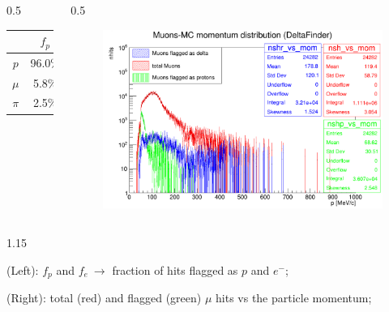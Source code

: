 \documentclass{beamer}
\begin{document}
\begin{frame}
\begin{columns}
\begin{column}{0.5\framewidth}
    \begin{table}[h!]
        \centering
        \renewcommand{\arraystretch}{1.}
        \begin{tabular}{| c | c | c | c | c|} 
        \hline
        &   $f_{p}$ &   $f_{e}$\\
        \hline
        $p$ &  96.0\% & 1.0\% \\
        \hline
        $\mu$ &  5.8\%  & 5.0\%\\
        \hline
        $\pi$ & 2.5\% &  11.2\%\\
        \hline
        \end{tabular}
        \label{tab:0bbpbarbefore}
    \end{table}
        \end{column}
        \begin{column}{0.5\framewidth}
             \begin{figure}[!h]
            \centering
            \includegraphics[width =0.9\columnwidth]{figures/png/Screenshot_20240805_222923.png}
           \label{fig:0pbarbefore}
\end{figure}
        \end{column}
    \end{columns}
    \vspace{-2mm}
    \begin{columns}
        \begin{column}{1.15\framewidth}
    \setlength{\leftmargini}{1.2em}
    \begin{itemize}
      {\small  \item (Left): $f_p$ and $f_e \ \rightarrow$ 
fraction of hits flagged as 
$p$ and $e^-$;
\vspace{1mm}
\item (Right): total (red) and flagged (green) $\mu$ hits vs the particle momentum;
}
\end{itemize}
\end{column}
\end{columns}
\end{frame}
\end{document}
